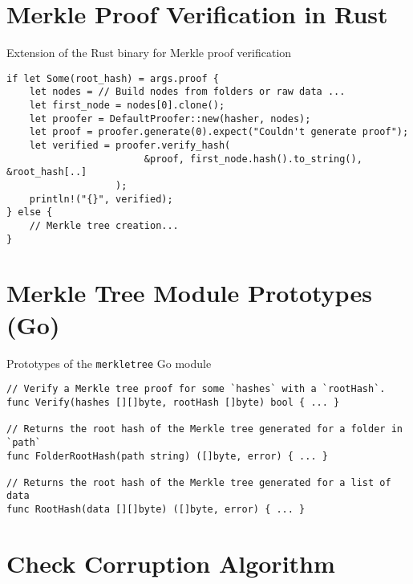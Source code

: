 \section{Merkle Proof Verification in Rust} \label{code:partial-mt-rs-2}
\begin{listing}[H]
\caption{Extension of the Rust binary for Merkle proof verification}
\begin{verbatim}
if let Some(root_hash) = args.proof {
    let nodes = // Build nodes from folders or raw data ...
    let first_node = nodes[0].clone();
    let proofer = DefaultProofer::new(hasher, nodes);
    let proof = proofer.generate(0).expect("Couldn't generate proof");
    let verified = proofer.verify_hash(
                        &proof, first_node.hash().to_string(), &root_hash[..]
                   );
    println!("{}", verified);
} else {
    // Merkle tree creation...
}
\end{verbatim}
\end{listing}

\section{Merkle Tree Module Prototypes (Go)} \label{code:prototypes-merkletree-module}

\begin{listing}[htp]
\caption{Prototypes of the \texttt{merkletree} Go module}
\begin{verbatim}
// Verify a Merkle tree proof for some `hashes` with a `rootHash`.
func Verify(hashes [][]byte, rootHash []byte) bool { ... }

// Returns the root hash of the Merkle tree generated for a folder in `path`
func FolderRootHash(path string) ([]byte, error) { ... }

// Returns the root hash of the Merkle tree generated for a list of data
func RootHash(data [][]byte) ([]byte, error) { ... }
\end{verbatim}
\end{listing}


\section{Check Corruption Algorithm} \label{code:check-corruption-algorithm}

